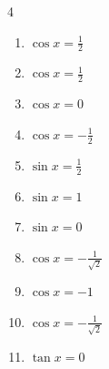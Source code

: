 \begin{multicols}{4}
\begin{enumerate}

  \item $\displaystyle \cos{x}  = \frac{1}{2}$


  \item $\displaystyle \cos{x}  = \frac{1}{2}$


  \item $\displaystyle \cos{x}  = 0$


\columnbreak %

  \item $\displaystyle \cos{x}  = -\frac{1}{2}$


  \item $\displaystyle \sin{x}  = \frac{1}{2}$


  \item $\displaystyle \sin{x}  = 1$


  \item $\displaystyle \sin{x}  = 0$

        \phantom{$\displaystyle x = 0 , \pi$}

  \item $\displaystyle \cos{x}  = -\frac{1}{\sqrt{2}}$


  \item $\displaystyle \cos{x}  = -1$

        \phantom{$\displaystyle x = \pi$}

  \item $\displaystyle \cos{x}  = -\frac{1}{\sqrt{2}}$


  \item $\displaystyle \tan{x}  = 0$

        \phantom{$\displaystyle x = 0 , \pi$}


\end{enumerate}
\end{multicols}
